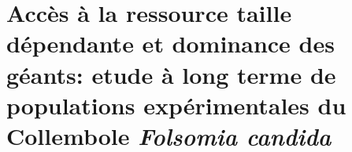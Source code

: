 \chapter[Accès à la ressource taille dépendante et dominance
des géants: etude à long terme de populations expérimentales du Collembole
\textit{Folsomia candida}][Etude à long terme]{Accès à la ressource taille
dépendante et dominance des géants: etude à long terme de populations
expérimentales du Collembole
\textit{Folsomia candida}}\label{Ann:SP}
